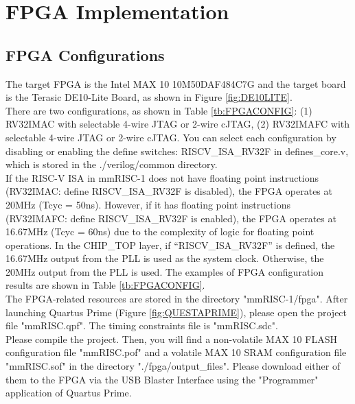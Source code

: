 \section{FPGA Implementation}

\subsection{FPGA Configurations}

The target FPGA is the Intel MAX 10 10M50DAF484C7G and the target board is the Terasic DE10-Lite Board, as shown in Figure \ref{fig:DE10LITE}.\\

There are two configurations, as shown in Table \ref{tb:FPGACONFIG}: (1) RV32IMAC with selectable 4-wire JTAG or 2-wire cJTAG, (2) RV32IMAFC with selectable 4-wire JTAG or 2-wire cJTAG. You can select each configuration by disabling or enabling the \textasciigrave define switches: RISCV\_ISA\_RV32F in defines\_core.v, which is stored in the ./verilog/common directory.\\

If the RISC-V ISA in mmRISC-1 does not have floating point instructions (RV32IMAC: \textasciigrave define RISCV\_ISA\_RV32F is disabled), the FPGA operates at 20MHz (Tcyc = 50ns). However, if it has floating point instructions (RV32IMAFC: \textasciigrave define RISCV\_ISA\_RV32F is enabled), the FPGA operates at 16.67MHz (Tcyc = 60ns) due to the complexity of logic for floating point operations. In the CHIP\_TOP layer, if “\textasciigrave RISCV\_ISA\_RV32F” is defined, the 16.67MHz output from the PLL is used as the system clock. Otherwise, the 20MHz output from the PLL is used. The examples of FPGA configuration results are shown in Table \ref{tb:FPGACONFIG}.\\

The FPGA-related resources are stored in the directory "mmRISC-1/fpga". After launching Quartus Prime (Figure \ref{fig:QUESTAPRIME}), please open the project file "mmRISC.qpf". The timing constraints file is "mmRISC.sdc". \\

Please compile the project. Then, you will find a non-volatile MAX 10 FLASH configuration file "mmRISC.pof" and a volatile MAX 10 SRAM configuration file "mmRISC.sof" in the directory "./fpga/output\_files". Please download either of them to the FPGA via the USB Blaster Interface using the "Programmer" application of Quartus Prime.


